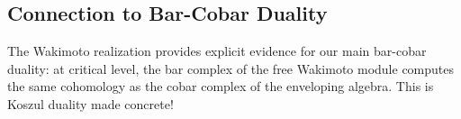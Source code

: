 \subsection{Connection to Bar-Cobar Duality}

\begin{remark}
The Wakimoto realization provides explicit evidence for our main bar-cobar duality: 
at critical level, the bar complex of the free Wakimoto module computes the same 
cohomology as the cobar complex of the enveloping algebra. This is Koszul duality made concrete!
\end{remark}

